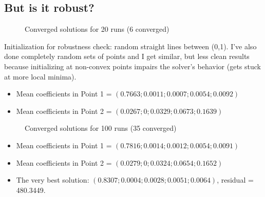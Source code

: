\documentclass[11pt]{article}
\def \myFigPath {../../figures/}
\renewcommand{\[}{\begin{equation}}
\renewcommand{\]}{\end{equation}}
\def\mySmallerFigScale{0.18}
\begin{document}
\subsection{But is it robust?}

\begin{figure}[h!]
\hfill
{}
\caption{Converged solutions for 20 runs (6 converged)}
\end{figure}

Initialization for robustness check: random straight lines between (0,1). I've also done completely random sets of points and I get similar, but less clean results because initializing at non-convex points impairs the solver's behavior (gets stuck at more local minima).
\begin{itemize}
\item Mean coefficients in Point 1 = $( 0.7663;    0.0011;    0.0007;    0.0054 ;   0.0092)$
\item Mean coefficients in Point 2 = $( 0.0267;    0;    0.0329;    0.0673;    0.1639)$
\end{itemize}


\clearpage

\begin{figure}[h!]
\hfill
{}
\caption{Converged solutions for 100 runs (35 converged)}
\end{figure}
\begin{itemize}
\item Mean coefficients in Point 1 = $( 0.7816;    0.0014;    0.0012;   0.0054;    0.0091)$
\item Mean coefficients in Point 2 = $(0.0279;    0;    0.0324;    0.0654;    0.1652 )$
\item The very best solution: $( 0.8307;    0.0004;    0.0028;    0.0051;    0.0064)$,  residual = 480.3449.
\end{itemize}
\end{document}
